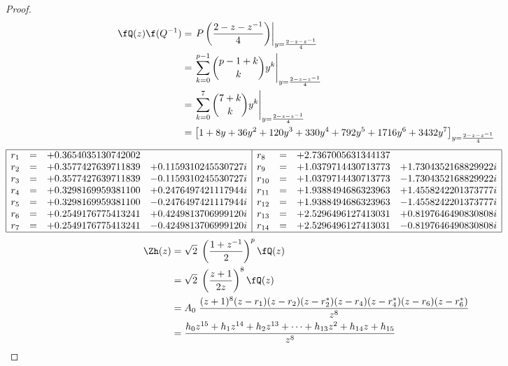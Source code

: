 \begin{proof}
\begin{align*}
   \fQ(z)\f(Q^{-1})
     &= \left.
        P\left( \frac{2-z-z^{-1}}{4} \right)
        \right|_{y=\frac{2-z-z^{-1}}{4}}
   \\&= \left.
        \sum\limits_{k=0}^{p-1} {{p-1+k}\choose{k}} y^k
        \right|_{y=\frac{2-z-z^{-1}}{4}}
   \\&= \left.
        \sum\limits_{k=0}^{7} {{7+k}\choose{k}} y^k
        \right|_{y=\frac{2-z-z^{-1}}{4}}
   \\&= \left[
        1 + 8y + 36y^2 + 120y^3 + 330y^4 + 792y^5 + 1716y^6  + 3432y^7
        \right]_{y=\frac{2-z-z^{-1}}{4}}
\end{align*}
{\footnotesize$\begin{array}{|lcrr|lcrr|}
    \hline
     r_{ 1} &=&  +0.3654035130742002 &                          &  r_{ 8} &=&  +2.7367005631344137  &                      
  \\ r_{ 2} &=&  +0.3577427639711839 &  +0.1159310245530727 i   &  r_{ 9} &=&  +1.0379714430713773  & +1.7304352168829922 i
  \\ r_{ 3} &=&  +0.3577427639711839 &  -0.1159310245530727 i   &  r_{10} &=&  +1.0379714430713773  & -1.7304352168829922 i
  \\ r_{ 4} &=&  +0.3298169959381100 &  +0.2476497421117944 i   &  r_{11} &=&  +1.9388494686323963  & +1.4558242201373777 i
  \\ r_{ 5} &=&  +0.3298169959381100 &  -0.2476497421117944 i   &  r_{12} &=&  +1.9388494686323963  & -1.4558242201373777 i
  \\ r_{ 6} &=&  +0.2549176775413241 &  +0.4249813706999120 i   &  r_{13} &=&  +2.5296496127413031  & +0.8197646490830808 i
  \\ r_{ 7} &=&  +0.2549176775413241 &  -0.4249813706999120 i   &  r_{14} &=&  +2.5296496127413031  & -0.8197646490830808 i
  \\\hline
\end{array}$}
\begin{align*}
  \Zh(z)
    &= \sqrt{2}\; \left(\frac{1+z^{-1}}{2}\right)^p \fQ(z)
  \\&= \sqrt{2}\; \left(\frac{z+1}{2z}\right)^8 \fQ(z)
  \\&= A_0\;
       \frac{(z+1)^8(z-r_1)(z-r_2)(z-r_2^\ast)(z-r_4)(z-r_4^\ast)(z-r_6)(z-r_6^\ast) }{z^{8}}
  \\&= \frac{h_0z^{15} + h_1z^{14} + h_2z^{13} + \cdots + h_{13}z^2 + h_{14}z + h_{15}}
            {z^{8}}
\end{align*}

\end{proof}
